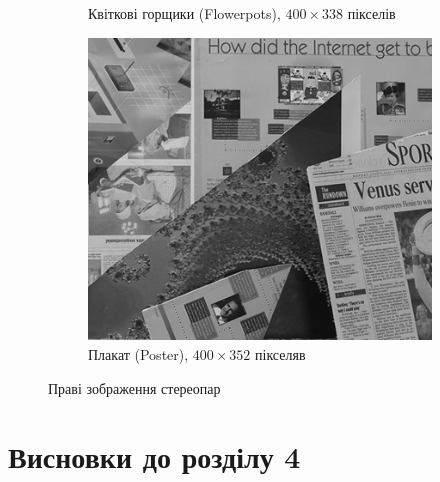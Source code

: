 \begin{figure}[h]
\begin{subfigure}[t]{0.32\textwidth}
        \caption{Квіткові горщики (Flowerpots), $400 \times 338$ пікселів}
        \label{fig:flowerpots:right}
    \end{subfigure}
    \hfill
    \begin{subfigure}[t]{0.32\textwidth}
        \centering
        \includegraphics[width=\textwidth]{images/poster_right}
        \caption{Плакат (Poster), $400 \times 352$ пікселяв}
        \label{fig:poster:right}
    \end{subfigure}
    \caption{Праві зображення стереопар}
    \label{fig:stereopair:right}
\end{figure}

\section*{Висновки до розділу 4}
